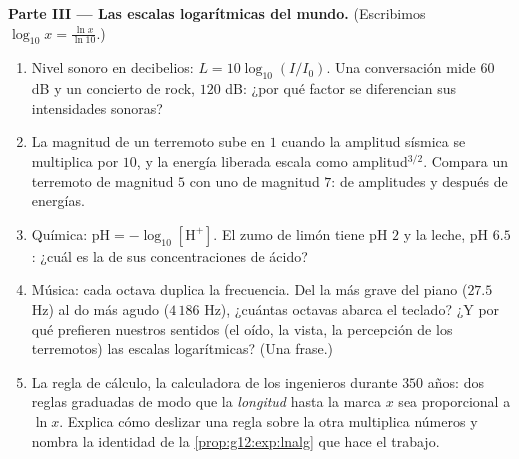 \begin{problem}
\medskip
\noindent\textbf{Parte III --- Las escalas logarítmicas del mundo.}
(Escribimos $\log_{10} x = \frac{\ln x}{\ln 10}$.)
\begin{enumerate}[resume]
  \item Nivel sonoro en decibelios: $L = 10 \log_{10}(I/I_0)$. Una
        conversación mide $60$ dB y un concierto de rock, $120$ dB: ¿por
        qué factor se diferencian sus intensidades sonoras?
  \item La magnitud de un terremoto sube en $1$ cuando la amplitud sísmica
        se multiplica por $10$, y la energía liberada escala como
        amplitud$^{3/2}$. Compara un terremoto de magnitud $5$ con uno de
        magnitud $7$:  de amplitudes y después  de energías.
  \item Química: $\text{pH} = -\log_{10}[\mathrm{H^+}]$. El zumo de limón
        tiene pH $2$ y la leche, pH $6.5$: ¿cuál es la  de sus
        concentraciones de ácido?
  \item Música: cada octava duplica la frecuencia. Del la más grave del
        piano ($27.5$ Hz) al do más agudo ($4\,186$ Hz), ¿cuántas octavas
        abarca el teclado? ¿Y por qué prefieren nuestros sentidos (el oído,
        la vista, la percepción de los terremotos) las escalas
        logarítmicas? (Una frase.)
  \item La regla de cálculo, la calculadora de los ingenieros durante $350$
        años: dos reglas graduadas de modo que la \emph{longitud} hasta la
        marca $x$ sea proporcional a $\ln x$. Explica cómo deslizar una
        regla sobre la otra multiplica números y nombra la identidad de la
        \cref{prop:g12:exp:lnalg} que hace el trabajo.
\end{enumerate}


\end{problem}
